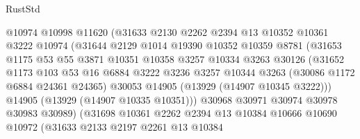 \begin{lexlean}{RustStd}
\begin{coremodule}
                          @10974
                          @10998
                          @11620
                          (@31633
                            @2130
                            @2262
                            @2394
                            @13
                            @10352
                            @10361
                            @3222
                            @10974
                            (@31644
                              @2129
                              @1014
                              @19390
                              @10352
                              @10359
                              @8781
                              (@31653
                                @1175
                                @53
                                @55
                                @3871
                                @10351
                                @10358
                                @3257
                                @10334
                                @3263
                                @30126
                                (@31652
                                  @1173
                                  @103
                                  @53
                                  @16
                                  @6884
                                  @3222
                                  @3236
                                  @3257
                                  @10344
                                  @3263
                                  (@30086 @1172 @6884 @24361 @24365)
                                  @30053
                                  @14905
                                  (@13929 (@14907 @10345 @3222)))
                                @14905
                                (@13929 (@14907 @10335 @10351)))
                              @30968
                              @30971
                              @30974
                              @30978
                              @30983
                              @30989)
                            (@31698
                              @10361
                              @2262
                              @2394
                              @13
                              @10384
                              @10666
                              @10690
                              @10972
                              (@31633
                                @2133
                                @2197
                                @2261
                                @13
                                @10384

\end{coremodule}
\end{lexlean}
